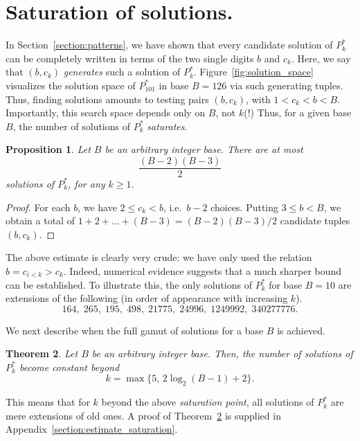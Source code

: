 \documentclass[sn-mathphys]{sn-jnl}%
\theoremstyle{thmstyleone}%
\newtheorem{theorem}{Theorem}%
\newtheorem{proposition}[theorem]{Proposition}%
\theoremstyle{thmstyletwo}%
\theoremstyle{thmstylethree}%
\begin{document}
\section{Saturation of solutions.}

In Section~\ref{section:patterns}, we have shown that every candidate solution of
$P^*_k$ can be completely written in terms of the two single digits $b$ and $c_k$.
Here, we say that $(b, c_k)$ \emph{generates} such a solution of $P^*_k$.
Figure~\ref{fig:solution_space} visualizes the solution space of $P^*_{101}$ in
base $B = 126$ via such generating tuples.
Thus, finding solutions amounts to testing pairs $(b, c_k)$, with $1 < c_k < b < B$.
Importantly, this search space depends only on $B$, not $k$(!)
Thus, for a given base $B$, the number of solutions of $P^*_k$ \emph{saturates}.

\begin{proposition} \label{proposition:number_pk}
    Let $B$ be an arbitrary integer base. There are at most \[
        \frac{(B - 2)(B - 3)}{2}
    \] solutions of $P^*_k$, for any $k \geq 1$.
\end{proposition}
\begin{proof}
    For each $b$, we have $2 \leq c_k < b$, i.e.\ $b - 2$ choices. Putting 
    $3 \leq b < B$, we obtain a total of $1 + 2 + \dots + (B - 3) = (B - 2)(B - 3) / 2$
    candidate tuples $(b, c_k)$.
\end{proof}

The above estimate is clearly very crude: we have only used the relation
$b = c_{i < k} > c_k$.
Indeed, numerical evidence suggests that a much sharper bound can be established.
To illustrate this, the only solutions of $P^*_k$ for base $B = 10$ are extensions
of the following (in order of appearance with increasing $k$).
\[
    164, \;
    265, \;
    195, \;
    498, \;
    21775, \;
    24996, \;
    1249992, \;
    340277776.
\]

We next describe when the full gamut of solutions for a base $B$ is achieved.

\begin{theorem} \label{theorem:saturation_point}
    Let $B$ be an arbitrary integer base. Then, the number of solutions of 
    $P^*_k$ become constant beyond \[
        k = \max\{5,\,2\log_2{(B-1)} + 2\}.
    \]
\end{theorem}

This means that for $k$ beyond the above \emph{saturation point}, all solutions of 
$P^*_k$ are mere extensions of old ones. A proof of
Theorem~\ref{theorem:saturation_point} is supplied in Appendix~\ref{section:estimate_saturation}.
\end{document}

